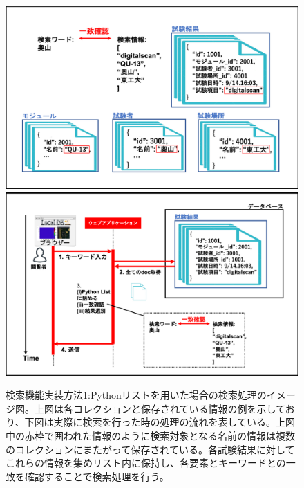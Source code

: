 \begin{figure}[bpt]
  \begin{center}
    \includegraphics[width=12cm]{./search_python_list.png}
    \includegraphics[width=12cm]{./search_python_list_flow.png}
  \caption[検索機能実装方法1:Pythonリストを用いた場合]
{検索機能実装方法1:Pythonリストを用いた場合の検索処理のイメージ図。上図は各コレクションと保存されている情報の例を示しており、下図は実際に検索を行った時の処理の流れを表している。上図中の赤枠で囲われた情報のように検索対象となる名前の情報は複数のコレクションにまたがって保存されている。各試験結果に対してこれらの情報を集めリスト内に保持し、各要素とキーワードとの一致を確認することで検索処理を行う。}
  \label{search_python_list}
  \end{center}
\end{figure}

